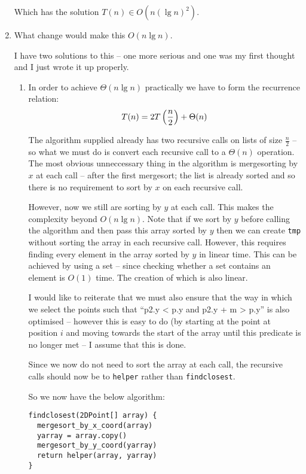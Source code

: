 \documentclass[10pt,\jkfside,a4paper]{article}
\begin{document}
\begin{enumerate}
Which has the solution $T(n) \in O(n (\lg n)^2)$.

\item What change would make this $O(n \lg n)$.

I have two solutions to this -- one more serious and one was my first thought and I just wrote it up properly.

\begin{enumerate}

\item In order to achieve $\Theta(n\lg n)$ practically we have to form the recurrence relation:
\begin{equation}
T(n) = 2 T\left(\frac{n}{2}\right) + \Theta(n)\\
\end{equation}

The algorithm supplied already has two recursive calls on lists of size $\frac{n}{2}$ -- 
so what we must do is convert each recursive call to a $\Theta(n)$ operation. The most 
obvious unneccessary thing in the algorithm is mergesorting by $x$ at each call -- after the 
first mergesort; the list is already sorted and so there is no requirement to sort by $x$
on each recursive call.

However, now we still are sorting by $y$ at each call. This makes the complexity beyond 
$O(n\lg n)$. Note that if we sort by $y$ before calling the algorithm and then pass 
this array sorted by $y$ then we can create {\tt tmp} without sorting the array in 
each recursive call. However, this requires finding every element in the array sorted by 
$y$ in linear time. This can be achieved by using a set -- since checking whether a set contains 
an element is $O(1)$ time. The creation of which is also linear.

I would like to reiterate that we must also ensure that the way in which we select the points such that 
``p2.y < p.y and p2.y + m > p.y'' is also optimised -- however this is easy to do 
(by starting at the point at position $i$ and moving towards the start of the array until this predicate 
is no longer met -- I assume that this is done.

Since we now do not need to sort the array at each call, the recursive calls should 
now be to {\tt helper} rather than {\tt findclosest}.

So we now have the below algorithm:

\begin{lstlisting}
findclosest(2DPoint[] array) {
  mergesort_by_x_coord(array)
  yarray = array.copy()
  mergesort_by_y_coord(yarray)
  return helper(array, yarray)
}


\end{lstlisting}
\end{enumerate}
\end{enumerate}
\end{document}
